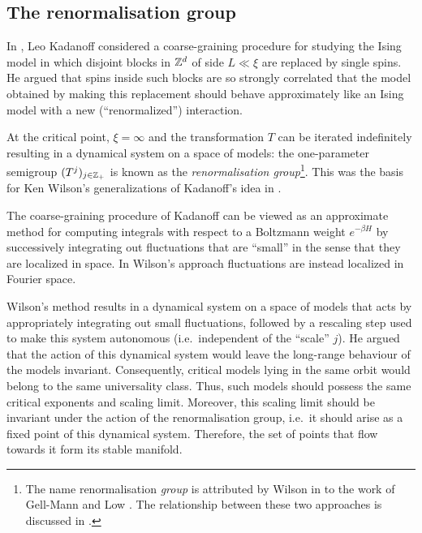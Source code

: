 
\subsection{The renormalisation group}
\label{sec:rg-intro}

In \cite{Kada66}, Leo Kadanoff considered a coarse-graining procedure for
studying the Ising model in which disjoint
blocks in ${ {{\mathbb Z}}^d }$ of side $L \ll \xi$ are replaced by single spins. He argued
that spins inside such blocks are so strongly correlated that the model
obtained by making this replacement should behave approximately like an Ising
model with a new (``renormalized'') interaction.

At the critical point, $\xi = \infty$ and the transformation
$T$ can be iterated indefinitely resulting in a dynamical system on a space
of models: the one-parameter semigroup $(T^j)_{j\in{\mathbb Z}_+}$ is known as the
\emph{renormalisation group}\footnote{The name renormalisation \emph{group}
is attributed by Wilson in \cite{Wils71I} to the work of Gell-Mann and Low
\cite{GML54}. The relationship between these two approaches is discussed in
\cite{JoLa75}.}. This was the basis for Ken Wilson's
generalizations of Kadanoff's idea in \cite{Wils71I,Wils71II}.

The coarse-graining procedure of Kadanoff can be viewed as an approximate
method for computing integrals with respect to a Boltzmann weight $e^{-\beta H}$
by successively integrating out fluctuations that are ``small'' in the sense
that they are localized in space. In Wilson's approach fluctuations are instead
localized in Fourier space.

Wilson's method results in a dynamical system on a space of
models that acts by appropriately integrating out small fluctuations, followed
by a rescaling step used to make this system autonomous (i.e.\ independent of
the ``scale'' $j$). He argued that the action of this dynamical system would
leave the long-range behaviour of the models invariant. Consequently, critical models
lying in the same orbit would belong to
the same universality class. Thus, such models should possess the same critical
exponents and scaling limit. Moreover, this scaling limit should be invariant
under the action of the renormalisation group, i.e.\ it should arise as a fixed
point of this dynamical system. Therefore, the set of points that flow towards it
form its stable manifold.

